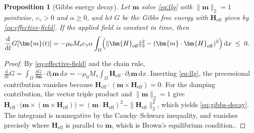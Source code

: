 \documentclass[a4paper,11pt]{article}
\newtheorem{proposition}{Proposition}
\begin{document}
\begin{proposition}[Gibbs energy decay]\label{prop:gibbs}
Let $\bm{m}$ solve \eqref{eq:llg} with $\|\bm{m}\|_2 = 1$ pointwise,
$c_\gamma > 0$ and $\alpha \ge 0$, and let $G$ be the Gibbs free energy with
$\bm{H}_{\mathrm{eff}}$ given by \eqref{eq:effective-field}. If the applied field
is constant in time, then
\begin{equation}\label{eq:gibbs-decay}
  \frac{\mathrm{d}}{\mathrm{d}t} G[\bm{m}(t)]
  = -\mu_0 M_s c_\gamma \alpha
    \int_\Omega \Bigl( \|\bm{H}_{\mathrm{eff}}\|_2^2
      - (\bm{m}\cdot\bm{H}_{\mathrm{eff}})^2 \Bigr)\,\mathrm{d}x
  \;\le\; 0 .
\end{equation}
\end{proposition}

\begin{proof}
By \eqref{eq:effective-field} and the chain rule,
$\frac{\mathrm{d}}{\mathrm{d}t} G
 = \int_\Omega \frac{\delta G}{\delta \bm{m}} \cdot \partial_t \bm{m} \,\mathrm{d}x
 = -\mu_0 M_s \int_\Omega \bm{H}_{\mathrm{eff}} \cdot \partial_t \bm{m}\,\mathrm{d}x$.
Inserting \ref{eq:llg}, the precessional contribution vanishes because
$\bm{H}_{\mathrm{eff}} \cdot (\bm{m}\times\bm{H}_{\mathrm{eff}}) = 0$. For the
damping contribution, the vector triple product and $\|\bm{m}\|_2 = 1$ give
$\bm{H}_{\mathrm{eff}} \cdot \bigl(\bm{m}\times(\bm{m}\times\bm{H}_{\mathrm{eff}})\bigr)
 = (\bm{m}\cdot\bm{H}_{\mathrm{eff}})^2 - \|\bm{H}_{\mathrm{eff}}\|_2^2$,
which yields \eqref{eq:gibbs-decay}. The integrand is nonnegative by the
Cauchy--Schwarz inequality, and vanishes precisely where $\bm{H}_{\mathrm{eff}}$
is parallel to $\bm{m}$, which is Brown's
equilibrium condition..
\end{proof}
\end{document}
